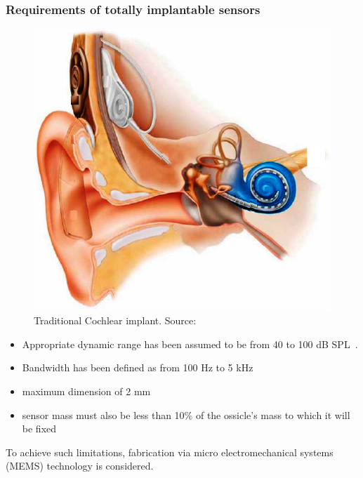 \documentclass[dvipsnames,12pt]{beamer}
\begin{document}
\begin{frame}
\frametitle{Requirements of totally implantable sensors}
\begin{minipage}[t][][t]{0.4\textwidth}
    \begin{figure}
  \centering
\includegraphics [width=\linewidth]{Figures/ICtrad}
\caption{Traditional Cochlear implant. Source: \cite{zeng2008}}
\end{figure}
\end{minipage}
\hfill
\begin{minipage}[t]{0.55\textwidth}
\begin{itemize}
    \item Appropriate dynamic range has been assumed to be from 40 to 100 dB SPL~\cite{ko2009}.
    \item Bandwidth has been defined as from 100 Hz to 5 kHz
    \item maximum dimension of 2 mm~\cite{sachse2013}
    \item sensor mass must also be less than 10\% of the ossicle's mass to which it will be fixed \pause
\end{itemize}
\end{minipage}
\vskip 0.3cm
To achieve such limitations, fabrication via micro electromechanical systems (MEMS) technology is considered.
\end{frame}
\end{document}

